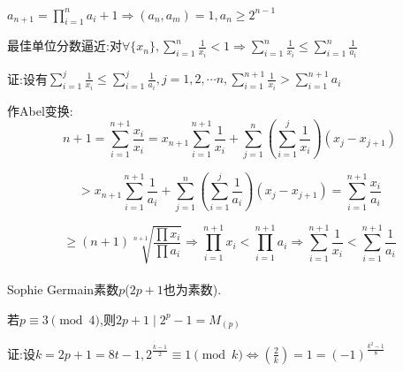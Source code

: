 $  a_{n+1}=\prod_{i=1}^{n}{a_i}+1\Rightarrow (a_n,a_m)=1,a_n\ge 2^{n-1}  $ 

最佳单位分数逼近:对$ \forall \{x_n\},\sum_{i=1}^{n}{\frac{1}{x_i}}<1\Rightarrow \sum_{i=1}^{n}{\frac{1}{x_i}}\le \sum_{i=1}^{n}{\frac{1}{a_i}}$

证:设有$ \sum_{i=1}^{j}{\frac{1}{x_i}}\le \sum_{i=1}^{j}{\frac{1}{a_i}},j=1,2,\cdots n,\sum_{i=1}^{n+1}{\frac{1}{x_i}}> \sum_{i=1}^{n+1}{a_i}$

作Abel变换:\[  n+1=\sum_{i=1}^{n+1}{\frac{x_i}{x_i}}=x_{n+1}\sum_{i=1}^{n+1}{\frac{1}{x_i}}+\sum_{j=1}^{n}{(\sum_{i=1}^{j}{\frac{1}{x_i}})(x_j-x_{j+1})} \]

\[ > x_{n+1}\sum_{i=1}^{n+1}{\frac{1}{a_i}}+\sum_{j=1}^{n}{(\sum_{i=1}^{j}{\frac{1}{a_i}})(x_j-x_{j+1})}=\sum_{i=1}^{n+1}{\frac{x_i}{a_i}}\]

\[ \ge (n+1) \sqrt[n+1]{\frac{\prod{x_i}}{\prod{a_i}}}\Rightarrow \prod_{i=1}^{n+1}{x_i}<\prod_{i=1}^{n+1}{a_i}\Rightarrow \sum_{i=1}^{n+1}{\frac{1}{x_i}}<\sum_{i=1}^{n+1}{\frac{1}{a_i}}\] 
\\

Sophie Germain素数$ p$($ 2p+1$也为素数).

若$ p\equiv 3 \pmod 4$,则$ 2p+1 \mid 2^p-1=M_{(p)}$

证:设$ k=2p+1=8t-1,2^{\frac{k-1}{2}}\equiv 1 \pmod k\Leftrightarrow (\frac{2}{k})=1=(-1)^{\frac{k^2-1}{8}}$
